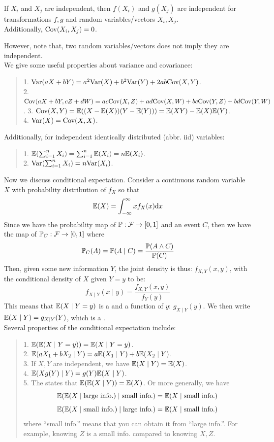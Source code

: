\begin{proposition}
    If $X_i$ and $X_j$ are independent, then $f(X_i)$ and $g(X_j)$ are independent for transformations $f, g$ and random variables/vectors $X_i, X_j$. \\
    Additionally, $\text{Cov}(X_i, X_j) = 0$.
\end{proposition}
However, note that, two  random variables/vectors does not imply they are independent. \\
We give some useful properties about variance and covariance:
\begin{quote}
    1. $\text{Var}(aX + bY) = a^2\text{Var}(X) + b^2\text{Var}(Y) + 2ab\text{Cov}(X, Y)$. \\
    2. $\text{Cov}(aX + bY, cZ + dW) = ac\text{Cov}(X, Z) + ad\text{Cov}(X, W) + bc\text{Cov}(Y, Z) + bd\text{Cov}(Y, W)$.
    3. $\text{Cov}(X, Y) = \mathbb{E}((X - \mathbb{E}(X))(Y - \mathbb{E}(Y))) = \mathbb{E}(XY) - \mathbb{E}(X)\mathbb{E}(Y)$. \\
    4. $\text{Var}(X) = \text{Cov}(X, X)$.
\end{quote}
Additionally, for independent identically distributed (abbr. iid) variables:
\begin{quote}
    1. $\mathbb{E}(\sum_{i = 1}^{n} X_i) = \sum_{i = 1}^{n} \mathbb{E}(X_i) = n \mathbb{E}(X_i)$. \\
    2. $\text{Var}(\sum_{i = 1}^{n} X_i) = n\text{Var}(X_i)$.
\end{quote}
Now we discuss conditional expectation. Consider a continuous random variable $X$ with probability distribution of $f_X$ so that
$$\mathbb{E}(X) = \int_{-\infty}^{\infty} xf_X(x)\dd x$$
Since we have the probability map of $\mathbb{P}: \mathcal{F} \to [0, 1]$ and an event $C$, then we have the map of $\mathbb{P}_C: \mathcal{F} \to [0, 1]$ where
$$\mathbb{P}_C(A) = \mathbb{P}(A \mid C) = \frac{\mathbb{P}(A \land C)}{\mathbb{P}(C)}$$
Then, given some new information $Y$, the joint density is thus: $f_{X, Y}(x, y)$, with the conditional density of $X$ given $Y = y$ to be:
$$f_{X \mid Y}(x \mid y) = \frac{f_{X, Y}(x, y)}{f_Y(y)}$$
This means that $\mathbb{E}(X \mid Y = y)$ is a  and a function of $y$: $g_{X \mid Y}(y)$. We then write $\mathbb{E}(X \mid Y) = g_{X \mid Y}(Y)$, which is a . \\
Several properties of the conditional expectation include:
\begin{quote}
    1. $\mathbb{E}(\mathbb{E}(X \mid Y = y)) = \mathbb{E}(X \mid Y = y)$. \\
    2. $\mathbb{E}(aX_1 + bX_2 \mid Y) = a\mathbb{E}(X_1 \mid Y) + b\mathbb{E}(X_2 \mid Y)$. \\
    3. If $X, Y$ are independent, we have $\mathbb{E}(X \mid Y) = \mathbb{E}(X)$. \\
    4. $\mathbb{E}(Xg(Y)\mid Y) = g(Y)\mathbb{E}(X \mid Y)$. \\
    5. The  states that $\mathbb{E}(\mathbb{E}(X \mid Y)) = \mathbb{E}(X)$. Or more generally, we have
    $$\mathbb{E}(\mathbb{E}(X \mid \text{large info.}) \mid \text{small info.}) = \mathbb{E}(X \mid \text{small info.})$$
    $$\mathbb{E}(\mathbb{E}(X \mid \text{small info.}) \mid \text{large info.}) = \mathbb{E}(X \mid \text{small info.})$$
    where ``small info.'' means that you can obtain it from ``large info.''. For example, knowing $Z$ is a small info. compared to knowing $X, Z$.
\end{quote}
